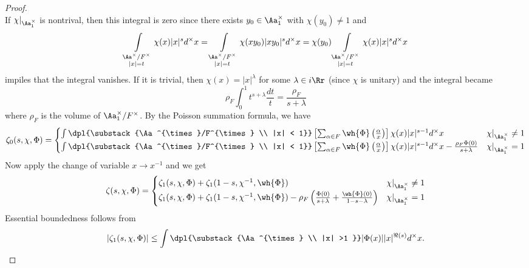 \documentclass{article}
\begin{document}
\begin{proof}
$$$$
If $\chi|_{\Aa^{\times}_{1}}$ is nontrival, then this integral is zero since there exists $y_{0}\in \Aa^{\times}_{1}$ with $\chi(y_{0}) \neq 1$ and
$$
\int\limits_{\substack{\Aa^{\times}/F^{\times} \\ |x| = t}} \chi(x)|x|^{s} d^{\times}x = \int\limits_{\substack{\Aa^{\times}/F^{\times} \\ |x| = t}} \chi(xy_{0})|xy_{0}|^{s} d^{\times}x = \chi(y_{0})\int\limits_{\substack{\Aa^{\times}/F^{\times} \\ |x| = t}} \chi(x)|x|^{s} d^{\times}x
$$
impiles that the integral vanishes. If  it is trivial, then $\chi(x) = |x|^{\lambda}$ for some $\lambda\in i\Rr$ (since $\chi$ is unitary) and the integral became
$$
\rho_{F} \int_{0}^{1} t^{s+\lambda} \frac{dt}{t} = \frac{\rho_{F}}{s+\lambda}
$$
where $\rho_{F}$ is the volume of $\Aa^{\times}_{1} /F^{\times}$. By the Poisson summation formula, we have
\begin{align*}
\zeta_{0}(s, \chi, \Phi) = \begin{cases} \int\dpl{\substack{\Aa^{\times}/F^{\times} \\ |x| < 1}} \left[ \sum_{\alpha\in F} \wh{\Phi}\left(\frac{\alpha}{x}\right)\right] \chi(x) |x|^{s-1}d^{\times}x & \chi|_{\Aa^{\times}_{1}} \neq 1 \\ \int\dpl{\substack{\Aa^{\times}/F^{\times} \\ |x| < 1}} \left[ \sum_{\alpha\in F} \wh{\Phi}\left(\frac{\alpha}{x}\right)\right] \chi(x) |x|^{s-1}d^{\times}x  - \frac{\rho_{F}\Phi(0)}{s + \lambda}& \chi|_{\Aa^{\times}_{1}} = 1\end{cases}
\end{align*}
Now apply the change of variable $x\to x^{-1}$ and we get 
\begin{align*}
\zeta(s, \chi, \Phi) = \begin{cases}\zeta_{1}(s, \chi, \Phi) + \zeta_{1}(1-s, \chi^{-1}, \wh{\Phi}) & \chi|_{\Aa^{\times}_{1}} \neq 1 \\
 \zeta_{1}(s, \chi, \Phi) + \zeta_{1}(1-s, \chi^{-1}, \wh{\Phi}) - \rho_{F} \left( \frac{\Phi(0)}{s+\lambda} + \frac{\wh{\Phi}(0)}{1-s-\lambda}\right)& \chi|_{\Aa^{\times}_{1}} = 1\end{cases}
\end{align*}
Essential boundedness follows from 
$$
|\zeta_{1}(s, \chi, \Phi)| \leq \int\dpl{\substack{\Aa^{\times} \\ |x| >1 }} |\Phi(x)||x|^{\Re (s)} d^{\times} x. 
$$
\end{proof}
\end{document}
